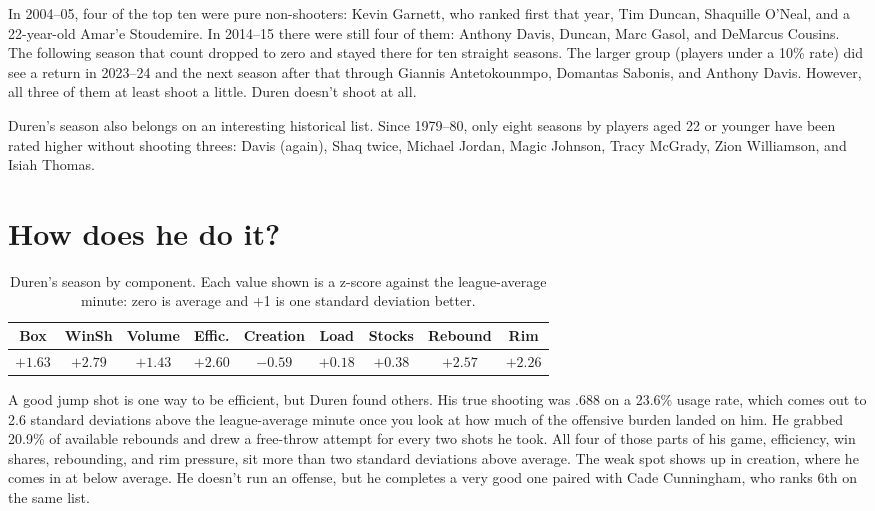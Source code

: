\documentclass[11pt]{article}
\begin{document}
In 2004--05, four of the top ten were pure non-shooters: Kevin Garnett, who ranked first that
year, Tim Duncan, Shaquille O'Neal, and a 22-year-old Amar'e Stoudemire. In 2014--15 there
were still four of them: Anthony Davis, Duncan, Marc Gasol, and DeMarcus Cousins. The
following season that count dropped to zero and stayed there for ten straight seasons. The
larger group (players under a 10\% rate) did see a return in 2023--24 and the next season
after that through Giannis Antetokounmpo, Domantas Sabonis, and Anthony Davis. However, all
three of them at least shoot a little. Duren doesn't shoot at all.

Duren's season also belongs on an interesting historical list. Since 1979--80, only eight
seasons by players aged 22 or younger have been rated higher without shooting threes: Davis
(again), Shaq twice, Michael Jordan, Magic Johnson, Tracy McGrady, Zion Williamson, and Isiah
Thomas.

\section*{How does he do it?}

\begin{table}[h]
\centering\small
\caption{Duren's season by component. Each value shown is a z-score against the
league-average minute: zero is average and +1 is one standard deviation better.}
\setlength{\tabcolsep}{5pt}
\begin{tabular}{ccccccccc}
\toprule
Box & WinSh & Volume & Effic. & Creation & Load & Stocks & Rebound & Rim \\
\midrule
$+1.63$ & $\mathbf{+2.79}$ & $+1.43$ & $\mathbf{+2.60}$ & $-0.59$ & $+0.18$ & $+0.38$ & $\mathbf{+2.57}$ & $\mathbf{+2.26}$ \\
\bottomrule
\end{tabular}
\label{tab:z}
\end{table}

A good jump shot is one way to be efficient, but Duren found others. His true shooting was
.688 on a 23.6\% usage rate, which comes out to 2.6 standard deviations above the
league-average minute once you look at how much of the offensive burden landed on him. He
grabbed 20.9\% of available rebounds and drew a free-throw attempt for every two shots he
took. All four of
those parts of his game, efficiency, win shares, rebounding, and rim pressure, sit more than
two standard deviations above average. The weak spot shows up in creation, where he comes in
at below average. He doesn't run an offense, but he completes a very good one paired with Cade
Cunningham, who ranks 6th on the same list.
\end{document}
